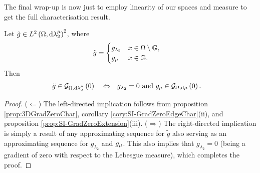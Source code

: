 The final wrap-up is now just to employ linearity of our spaces and measure to get the full characterisation result.
\begin{theorem} \label{thm:SI-GradZeroChar}
	Let $\tilde{g}\in L^{2}\left( \Omega,\mathrm{d} \lambda_2^{\mu} \right)^2$, where
	\begin{align*}
		\tilde{g} &= \begin{cases} g_{\lambda_2} & x\in\Omega\setminus\mathbb{G}, \\ g_{\mu} & x\in\mathbb{G}. \end{cases}
	\end{align*}
	Then
	\begin{align*}
		\tilde{g}\in\mathcal{G}_{ \Omega, \mathrm{d}\lambda_2^{\mu}}\left( 0 \right)
		\quad\Leftrightarrow\quad &
		g_{\lambda_2} = 0 \text{ and } g_{\mu}\in\mathcal{G}_{ \Omega, \mathrm{d}\mu}\left( 0 \right).
	\end{align*}
\end{theorem}
\begin{proof}
	($\Leftarrow$) The left-directed implication follows from proposition \ref{prop:3DGradZeroChar}, corollary \ref{cory:SI-GradZeroEdgeChar}(ii), and proposition \ref{prop:SI-GradZeroExtension}(iii). \newline
	($\Rightarrow$) The right-directed implication is simply a result of any approximating sequence for $\tilde{g}$ also serving as an approximating sequence for $g_{\lambda_2}$ and $g_{\mu}$.
	This also implies that $g_{\lambda_2} = 0$ (being a gradient of zero with respect to the Lebesgue measure), which completes the proof.
\end{proof}

